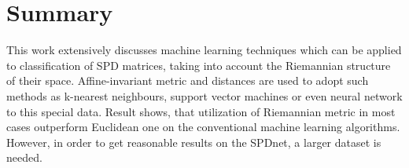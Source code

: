 \documentclass[12pt]{extarticle}
\theoremstyle{definition}
\theoremstyle{remark}
\begin{document}
	
	\section{Summary}
	This work extensively discusses machine learning techniques which can be applied to classification of SPD matrices, taking into account the Riemannian structure of their space. Affine-invariant metric and distances are used to adopt such methods as k-nearest neighbours, support vector machines or even neural network to this special data. Result shows, that utilization of Riemannian metric in most cases outperform Euclidean one on the conventional machine learning algorithms. However, in order to get reasonable results on the SPDnet, a larger dataset is needed.
	
	\newpage
	{}
	\nocite{*}
	
	
\end{document}
